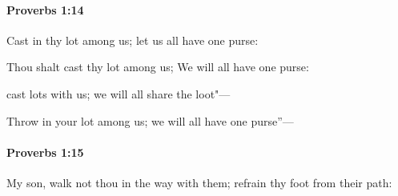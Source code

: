 		\paragraph{Proverbs 1:14} %
			\label{PROVERBS-1-14}

			Cast in thy lot among us; let us all have one purse:

			\begin{versebox}
					\item[BHS] 
					\item[ASV] Thou shalt cast thy lot among us; We will all have one purse:
					\item[NIV] cast lots with us; we will all share the loot"—
					\item[NRSV] Throw in your lot among us; we will all have one purse”—
			\end{versebox}

		\paragraph{Proverbs 1:15} %
			\label{PROVERBS-1-15}

			My son, walk not thou in the way with them; refrain thy foot from their path:

